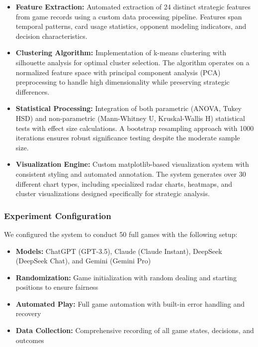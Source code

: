\documentclass{article}
\begin{document}
\begin{itemize}
    \item \textbf{Feature Extraction:} Automated extraction of 24 distinct strategic features from game records using a custom data processing pipeline. Features span temporal patterns, card usage statistics, opponent modeling indicators, and decision characteristics.
    
    \item \textbf{Clustering Algorithm:} Implementation of k-means clustering with silhouette analysis for optimal cluster selection. The algorithm operates on a normalized feature space with principal component analysis (PCA) preprocessing to handle high dimensionality while preserving strategic differences.
    
    \item \textbf{Statistical Processing:} Integration of both parametric (ANOVA, Tukey HSD) and non-parametric (Mann-Whitney U, Kruskal-Wallis H) statistical tests with effect size calculations. A bootstrap resampling approach with 1000 iterations ensures robust significance testing despite the moderate sample size.
    
    \item \textbf{Visualization Engine:} Custom matplotlib-based visualization system with consistent styling and automated annotation. The system generates over 30 different chart types, including specialized radar charts, heatmaps, and cluster visualizations designed specifically for strategic analysis.
\end{itemize}

\subsubsection{Experiment Configuration}
We configured the system to conduct 50 full games with the following setup:
\begin{itemize}
    \item \textbf{Models:} ChatGPT (GPT-3.5), Claude (Claude Instant), DeepSeek (DeepSeek Chat), and Gemini (Gemini Pro)
    \item \textbf{Randomization:} Game initialization with random dealing and starting positions to ensure fairness
    \item \textbf{Automated Play:} Full game automation with built-in error handling and recovery
    \item \textbf{Data Collection:} Comprehensive recording of all game states, decisions, and outcomes
\end{itemize}
\end{document}
